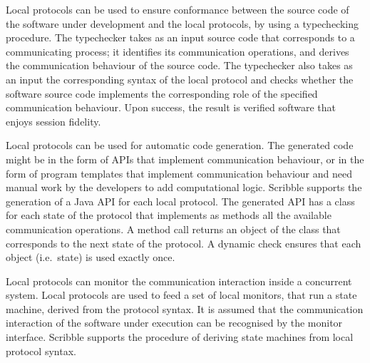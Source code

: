 Local protocols can be used
to ensure
conformance between the source code of the
software under development and the local protocols,
by using a typechecking procedure.
The typechecker takes as an input
source code that corresponds to a communicating process;
it identifies its communication operations,
and derives the communication behaviour of
the
source code.
The typechecker also takes as an input the
corresponding syntax of the local protocol
and checks whether the
software source code
implements the corresponding role of the specified communication behaviour.
Upon success, the result is verified software that
enjoys session fidelity.

Local protocols can be used 
for automatic code generation. The generated
code might be in the form of APIs that implement
communication behaviour, or in the form of program
templates that implement communication behaviour and
need manual work by the developers to add
computational logic.
Scribble supports the generation of a Java API for
each local protocol. %
The generated API has a class for each state of the protocol
that implements as methods all the available communication
operations. A method call returns an object of the class
that corresponds to the next state of the protocol. A dynamic
check ensures that each object (i.e.~state) is used exactly once.


Local protocols can
monitor %
the communication
interaction inside a concurrent system.
Local protocols are used to feed a set of local monitors,
that
run a state machine, derived
from the
protocol syntax.
It is assumed that the communication interaction
of the software under execution can be recognised
by the monitor interface.
Scribble supports the procedure of deriving
state machines from local protocol syntax.

